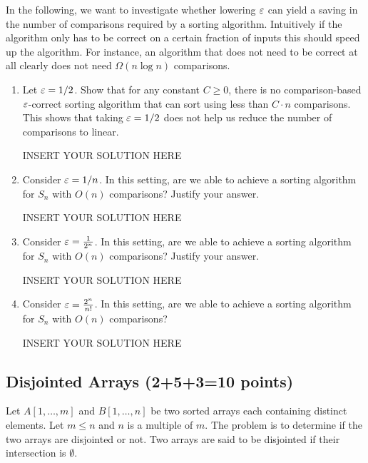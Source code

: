 \noindent
In the following, we want to investigate whether lowering $\varepsilon$ can yield a saving in the number of comparisons required by a sorting algorithm. Intuitively if the algorithm only has to be correct on a certain fraction of inputs this should speed up the algorithm. For instance, an algorithm that does not need to be correct at all clearly does not need $\Omega(n \log n)$ comparisons.  

\begin{enumerate}[resume]
    \item Let $\varepsilon=1/2$. Show that for any constant $C\geq 0$, there is no comparison-based $\varepsilon$-correct sorting algorithm that can sort using less than $C \cdot n$ comparisons. This shows that taking $\varepsilon=1/2$ does not help us reduce the number of comparisons to linear. 
\begin{solution}   INSERT YOUR SOLUTION HERE   \end{solution}

    \item Consider $\varepsilon=1/n$. In this setting, are we able to achieve a sorting algorithm for $S_n$ with $O(n)$ comparisons? Justify your answer.
\begin{solution}   INSERT YOUR SOLUTION HERE   \end{solution}
    
    \item Consider $\varepsilon=\frac{1}{2^n}$. In this setting, are we able to achieve a sorting algorithm for $S_n$ with $O(n)$ comparisons? Justify your answer.
\begin{solution}   INSERT YOUR SOLUTION HERE   \end{solution}
    
    \item Consider $\varepsilon=\frac{2^n}{n!}$. In this setting, are we able to achieve a sorting algorithm for $S_n$ with $O(n)$ comparisons?
\begin{solution}   INSERT YOUR SOLUTION HERE   \end{solution}
\end{enumerate}



\subsection*{Disjointed Arrays (2+5+3=10 points)}
Let $A[1,\ldots,m]$ and $B[1,\ldots,n]$ be two sorted
arrays each containing distinct elements. Let
$m\leq n$ and $n$ is a multiple of $m$. 
The problem is to determine if the two arrays
are disjointed or not. Two arrays are said
to be disjointed if their intersection is
$\emptyset$. 

